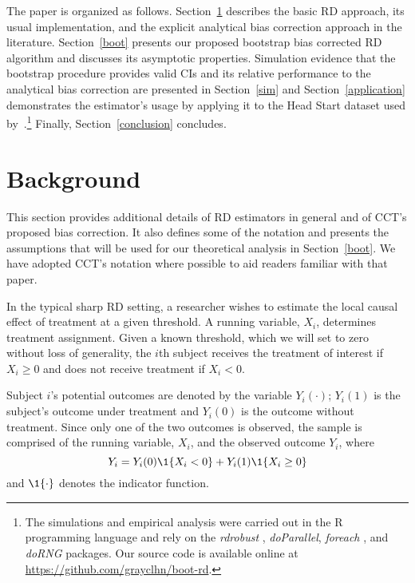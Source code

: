 \documentclass[12pt,fleqn]{article}
\begin{document}
The paper is organized as follows. Section~\ref{background} describes the basic
RD approach, its usual implementation, and the explicit analytical bias
correction approach in the literature. Section~\ref{boot} presents our proposed
bootstrap bias corrected RD algorithm and discusses its asymptotic
properties. Simulation evidence that the bootstrap procedure provides valid CIs
and its relative performance to the analytical bias correction are presented in
Section~\ref{sim} and Section~\ref{application} demonstrates the estimator's
usage by applying it to the Head Start dataset used
by~\cite{ludwig2007}.\footnote{%
  The simulations and empirical analysis were carried out in the R programming
  language \citep{R} and rely on the \textit{rdrobust} \citep{rdrobust},
  \textit{doParallel}, \textit{foreach} \citep{doparallel,foreach}, and
  \textit{doRNG} \citep{dorng} packages. Our source code is available online
  at \url{https://github.com/grayclhn/boot-rd}.} %
Finally, Section~\ref{conclusion} concludes.

\section{Background}\label{background}

This section provides additional details of RD estimators in general and of
CCT's proposed bias correction. It also defines some of the notation and
presents the assumptions that will be used for our theoretical analysis in
Section~\ref{boot}. We have adopted CCT's notation where possible to aid
readers familiar with that paper.

In the typical sharp RD setting, a researcher wishes to estimate the local
causal effect of treatment at a given threshold. A running variable, $X_{i}$,
determines treatment assignment.  Given a known threshold, which we
will set to zero without loss of generality, the $i$th subject receives the
treatment of interest if $X_{i} \geq 0$ and does not receive treatment if
$X_{i} < 0$.

Subject $i$'s potential outcomes are denoted by the variable $Y_i(\cdot)$;
$Y_i(1)$ is the subject's outcome under treatment and $Y_i(0)$
is the outcome without treatment. Since only one of the two
outcomes is observed, the sample is comprised of the running variable, $X_{i}$,
and the observed outcome $Y_i$, where
\begin{equation*}
  Y_{i}=Y_{i}(0) \1\{X_{i}<0\}+Y_{i}(1) \1\{X_{i} \geq 0\}
\end{equation*}
and $\1\{ \cdot\}$ denotes the indicator function.
\end{document}
